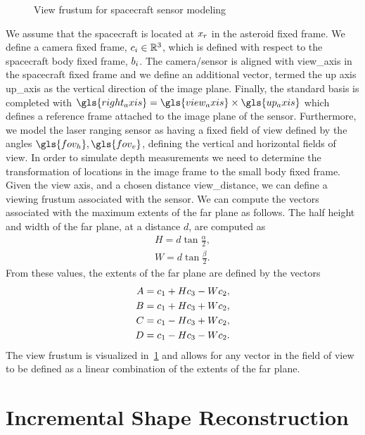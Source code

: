 \begin{figure}[htbp]
    \centering
    
    \caption{View frustum for spacecraft sensor modeling\label{fig:view_frustrum}}
\end{figure}
We assume that the spacecraft is located at \(x_r\) in the asteroid fixed frame.
We define a camera fixed frame, \( c_i \in \mathbb{R}^3 \), which is defined with respect to the spacecraft body fixed frame, \( b_i \).
The camera/sensor is aligned with \gls{view_axis} in the spacecraft fixed frame and we define an additional vector, termed the up axis \gls{up_axis} as the vertical direction of the image plane. 
Finally, the standard basis is completed with \(  \gls{right_axis} = \gls{view_axis} \times \gls{up_axis} \) which defines a reference frame attached to the image plane of the sensor.
Furthermore, we model the laser ranging sensor as having a fixed field of view defined by the angles \( \gls{fov_h}, \gls{fov_v}\), defining the vertical and horizontal fields of view.
In order to simulate depth measurements we need to determine the transformation of locations in the image frame to the small body fixed frame. 
Given the view axis, and a chosen distance \gls{view_distance}, we can define a viewing \gls{frustum} associated with the sensor. 
We can compute the vectors associated with the maximum extents of the far plane as follows.
The half height and width of the far plane, at a distance \( d \), are computed as
\begin{align*}
    H = d \tan \frac{\alpha}{2} , \\
    W = d \tan \frac{\beta}{2} .
\end{align*}
From these values, the extents of the far plane are defined by the vectors
\begin{align*}
    A = c_1 + H c_3 - W c_2 , \\
    B = c_1 + H c_3 + W c_2, \\
    C = c_1 - H c_3 + W c_2, \\
    D = c_1 - H c_3 - W c_2.
\end{align*}
The view frustum is visualized in~\cref{fig:view_frustrum} and allows for any vector in the field of view to be defined as a linear combination of the extents of the far plane.

\section{Incremental Shape Reconstruction}\label{sec:radius_update}

